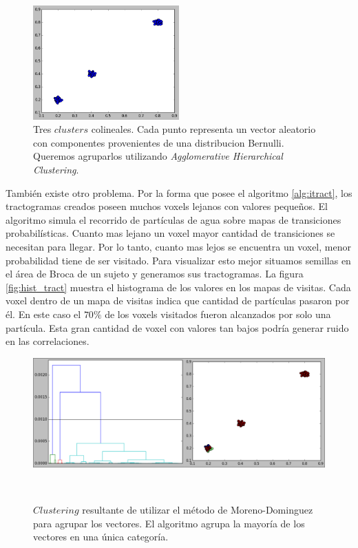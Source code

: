 \begin{figure}[h!]
        \centering
        \includegraphics[width=0.5\textwidth]{img/3pop.png}
        \caption{Tres $clusters$ colineales. Cada punto representa un
                 vector aleatorio con componentes provenientes de una
                 distribucion Bernulli. Queremos agruparlos utilizando
                 \textit{Agglomerative Hierarchical Clustering}.}
        \label{fig:3clusters}
\end{figure}

Tambi\'en existe otro problema. Por la forma que posee el algoritmo 
\ref{alg:itract}, los tractogramas creados poseen muchos voxels lejanos
con valores peque\~nos. El algoritmo simula el recorrido de part\'iculas de
agua sobre mapas de transiciones probabil\'isticas. Cuanto mas lejano un 
voxel mayor cantidad de transiciones se necesitan para llegar. Por lo 
tanto, cuanto mas lejos se encuentra un voxel, menor probabilidad tiene de
ser visitado. Para visualizar esto mejor situamos semillas en el \'area
de Broca de un sujeto y generamos sus tractogramas. La figura 
\ref{fig:hist_tract} muestra el histograma de los valores en los mapas de
visitas. Cada voxel dentro de un mapa de visitas indica que cantidad de 
part\'iculas pasaron por \'el.
En este caso el $70\%$ de los voxels visitados fueron alcanzados por solo
una part\'icula. Esta gran cantidad de voxel con valores tan bajos podr\'ia
generar ruido en las correlaciones. \\

\begin{figure}[h!]

\centering                                                                                                          
\begin{minipage}[b]{0.85\textwidth}
    \includegraphics[width=\textwidth]{img/3pop_moreno.png}
    \caption{$Clustering$ resultante de utilizar el m\'etodo de 
             Moreno-Dominguez para agrupar los vectores. El algoritmo
             agrupa la mayor\'ia de los vectores en una \'unica 
             categor\'ia.}
    \label{fig:3moreno}
\end{minipage} ~

\end{figure}  

